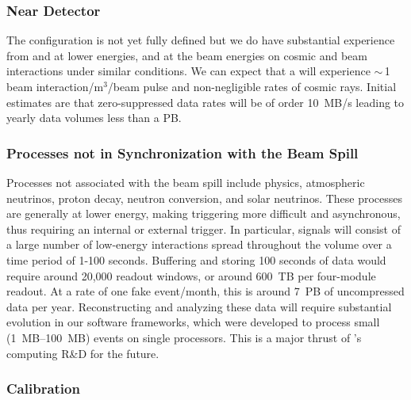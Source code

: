 \subsubsection{Near Detector} 

The  configuration is not yet fully defined  but we do have substantial experience from  and   at lower energies, and   at the   beam energies on cosmic and beam interactions under similar conditions.  We can expect that a  will experience $\sim\,$1 beam interaction/m$^3$/beam pulse and non-negligible rates of cosmic rays. Initial estimates are that zero-suppressed data rates will be of order \SI{10}{MB/s} leading to yearly data volumes less than a PB.  

\subsubsection{Processes not in Synchronization with the Beam Spill} 

Processes not associated with the beam spill %
include  physics, atmospheric neutrinos, proton decay, neutron conversion, and solar neutrinos.  These processes are generally at lower energy, making triggering more difficult and asynchronous, thus requiring an internal or external trigger.  In particular,  signals will consist of a large number of low-energy interactions spread throughout the  volume over a time period of 1-100 seconds. Buffering and storing 100 seconds of data would require around 20,000 readout windows, or around \SI{600}{TB} per four-module  readout.  At a rate of one fake  event/month, this is around \SI{7}{PB} of uncompressed data per year.  Reconstructing and analyzing these data will require substantial evolution in our software frameworks, which were developed to process small (\SIrange{1}{100}{MB}) events on single processors. This is a major thrust of 's computing R\&D for the future. 

\subsubsection{
Calibration}


